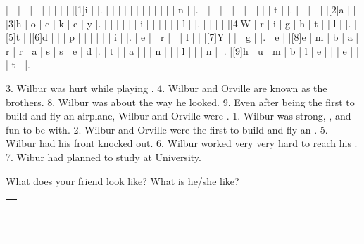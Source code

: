 \bannerRC                
\begin{cwpuzzle}                                                        
\begin{minipage}{92mm}%
  \begin{Puzzle}{13}{11}
   |{}   |{}   |{}   |{}   |{}   |{}   |{}   |{}   |{}   |{}   |{}   |[1]i |{}   |.
   |{}   |{}   |{}   |{}   |{}   |{}   |{}   |{}   |{}   |{}   |{}   |   n |{}   |.
   |{}   |{}   |{}   |{}   |{}   |{}   |{}   |{}   |{}   |{}   |{}   |   t |{}   |.
   |{}   |{}   |{}   |{}   |{}   |[2]a |{}   |[3]h |   o |   c |   k |   e |   y |.
   |{}   |{}   |{}   |{}   |{}   |   i |{}   |{}   |{}   |{}   |{}   |   l |{}   |.
   |{}   |{}   |{}   |{}   |[4]W |   r |   i |   g |   h |   t |{}   |   l |{}   |.
   |[5]t |{}   |[6]d |{}   |{}   |   p |{}   |{}   |{}   |{}   |{}   |   i |{}   |.
   |   e |{}   |   r |{}   |{}   |   l |{}   |{}   |[7]Y |{}   |{}   |   g |{}   |.
   |   e |{}   |[8]e |   m |   b |   a |   r |   r |   a |   s |   s |   e |   d |.
   |   t |{}   |   a |{}   |{}   |   n |{}   |{}   |   l |{}   |{}   |   n |{}   |.
   |[9]h |   u |   m |   b |   l |   e |{}   |{}   |   e |{}   |{}   |   t |{}   |.
  \end{Puzzle}
\end{minipage}%
\hfill
\begin{minipage}{\tw-100mm}%
  \footnotesize
  3. Wilbur was hurt while playing .
  4. Wilbur and Orville are known as the  brothers.
  8. Wilbur was  about the way he looked.
  9. Even after being the first to build and fly an airplane, Wilbur and Orville were .
  1. Wilbur was strong, , and fun to be with.
  2. Wilbur and Orville were the first to build and fly an .
  5. Wilbur had his front  knocked out.
  6. Wilbur worked very very hard to reach his .
  7. Wibur had planned to study at  University.
\end{minipage}%
\end{cwpuzzle}


\newpage

\bannerWriting
What does your friend look like? What is he/she like?

\begin{tabstr}{2}
\begin{tabular}{|p{\tw-2mm}|}
  \hline
  \\\hline
  \\\hline
  \\\hline
  \\\hline
  \\\hline
  \\\hline
  \\\hline
  \\\hline
  \\\hline
  \\\hline
\end{tabular}
\end{tabstr}












